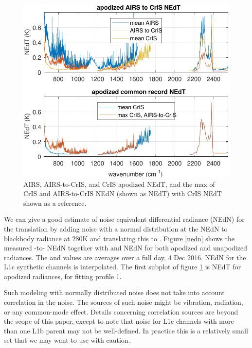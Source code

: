 \documentclass[journal]{IEEEtran}
\begin{document}
\begin{figure} %
  \centering
  \includegraphics[width=\linewidth]{figures/a2cris_nedt.pdf}
  \caption{AIRS, AIRS-to-CrIS, and CrIS apodized NEdT,
    and the max of CrIS and AIRS-to-CrIS NEdN (shown as
    NEdT) with CrIS NEdT shown as a reference.}
  \label{nedt}
\end{figure}

We can give a good estimate of noise equivalent differential
radiance (NEdN) for the translation by adding noise with a normal
distribution at the {\airs} NEdN to blackbody radiance at 280K and
translating this to {\cris}.  Figure \ref{nedn} shows the measured
{\airs}-to-{\cris} NEdN together with {\airs} and {\cris} NEdN for
both apodized and unapodized radiances.  The {\airs} and {\cris}
values are averages over a full day, 4 Dec 2016.  NEdN for the L1c
synthetic channels is interpolated.  The first subplot of figure
\ref{nedt} is NEdT for apodized radiances, for fitting profile 1.

Such modeling with normally distributed noise does not take into
account correlation in the {\airs} noise.  The sources of such noise
might be vibration, radiation, or any common-mode effect.  Details
concerning correlation sources are beyond the scope of this paper,
except to note that noise for L1c channels with more than one L1b
parent may not be well-defined.  In practice this is a relatively
small set that we may want to use with caution.

\end{document}
